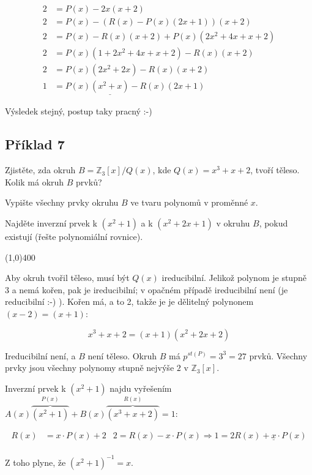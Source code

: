 \documentclass{article}
\begin{document}
\begin{enumerate}
\begin{align*}
2 & = P(x) - 2x(x+2) \\
2	& = P(x) - (R(x) - P(x)(2x+1))(x+2) \\
2 & = P(x) - R(x)(x+2) + P(x)(2x^2 + 4x + x + 2) \\
2 & = P(x)(1 + 2x^2 + 4x + x + 2) - R(x)(x+2) \\
2 & = P(x)(2x^2 + 2x) - R(x)(x+2) \\
1 & = P(x)\underline{(x^2+x)} - R(x)(2x+1)
\end{align*}

Výsledek stejný, postup taky pracný :-)

\end{enumerate}

\subsection{Příklad 7}
Zjistěte, zda okruh $B = \mathbb{Z}_3[x]/Q(x)$, kde $Q(x) = x^3 + x + 2$, tvoří těleso. Kolik má okruh $B$ prvků?

Vypište všechny prvky okruhu $B$ ve tvaru polynomů v proměnné $x$.

Najděte inverzní prvek k $(x^2 + 1)$ a k $(x^2 + 2x + 1)$ v okruhu $B$, pokud existují (řešte polynomiální rovnice).

\line(1,0){400}

Aby okruh tvořil těleso, musí být $Q(x)$ ireducibilní. Jelikož polynom je stupně 3 a nemá kořen, pak je ireducibilní; v opačném případě ireducibilní není (je reducibilní :-) ). Kořen má, a to 2, takže je je dělitelný polynonem $(x - 2) = (x + 1)$:

\[ x^3 + x + 2 = (x+1)(x^2 + 2x + 2)\]

Ireducibilní není, a $B$ není těleso. Okruh $B$ má $p^{st(P)} = 3^3 = 27$ prvků. Všechny prvky jsou všechny polynomy stupně nejvýše $2$ v $\mathbb{Z}_3[x]$.

Inverzní prvek k $(x^2 + 1)$ najdu vyřešením $A(x)\overbrace{(x^2 + 1)}^{P(x)} + B(x)\overbrace{(x^3 + x + 2)}^{R(x)} = 1$:

\begin{align*}
R(x) 	& = x\cdot P(x) + 2 & 2 = R(x) - x\cdot P(x) \Rightarrow 1 = 2R(x) + \underline{x}\cdot P(x) \\
\end{align*}

Z toho plyne, že $(x^2 + 1)^{-1} = x$.
\end{document}
